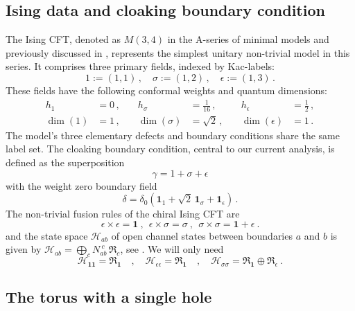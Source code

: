 \documentclass[11pt,a4paper]{article}
\numberwithin{equation}{section}
\newcommand{\one}{\mathbf{1}} %
\begin{document}
\subsection{Ising data and cloaking boundary condition}

The Ising CFT, denoted as $M(3,4)$ in the A-series of minimal models and previously discussed in \cite[Sec. 8.1]{Brehm:2021wev}, represents the simplest unitary non-trivial model in this series. It comprises three primary fields, indexed by Kac-labels:
%
\begin{equation}
    1 := (1,1)\,,\quad \sigma := (1,2)\,,\quad \epsilon:= (1,3)\,.
\end{equation}
%
These fields have the following conformal weights and quantum dimensions:
%
\begin{align}\nonumber
 h_1 &= 0\,,\quad& h_\sigma &= \frac{1}{16}\,,\quad& h_\epsilon&=\frac{1}{2}\,,\\ 
 \dim(1) &= 1\,,\quad& \dim(\sigma) &= \sqrt{2}\,,\quad& \dim(\epsilon) &= 1\,.
\end{align}
%
The model's three elementary defects and boundary conditions share the same label set. The cloaking boundary condition, central to our current analysis, is defined as the superposition 
%
\begin{equation}
    \gamma = 1 + \sigma + \epsilon
\end{equation}
%
with the weight zero boundary field 
%
\begin{equation}
    \delta = \delta_0 \left(\one_1 + \sqrt{2}\, \one_\sigma + \one_\epsilon\right)\,.
\end{equation}
%
The non-trivial fusion rules of the chiral Ising CFT are
%
\begin{equation}
	\epsilon \times \epsilon = \one
	~,~~
	\epsilon \times \sigma = \sigma
~,~~
	\sigma \times \sigma = \one + \epsilon ~.
\end{equation}
%
and the state space $\mathcal{H}_{ab}$ of open channel states between boundaries $a$ and $b$ is given by $\mathcal{H}_{ab} = \bigoplus_{c}  N_{ab}^{~c}\, \mathfrak{R}_c$, see \cite{Cardy:1989ir}. We will only need
%
\begin{equation}
    \mathcal{H}_{\one\one} = \mathfrak{R}_{\one}
    \quad , \quad 
    \mathcal{H}_{\epsilon\epsilon} = \mathfrak{R}_{\one}
    \quad , \quad
    \mathcal{H}_{\sigma\sigma} = \mathfrak{R}_{\one} \oplus \mathfrak{R}_{\epsilon} ~.
\end{equation}

\subsection{The torus with a single hole}
\end{document}
